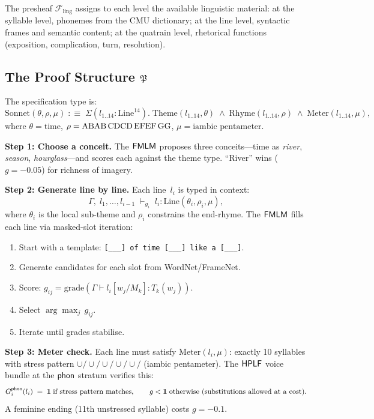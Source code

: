 The presheaf $\mathcal{F}_{\mathrm{ling}}$ assigns to each level
the available linguistic material: at the syllable level, phonemes
from the CMU dictionary; at the line level, syntactic frames and
semantic content; at the quatrain level, rhetorical functions
(exposition, complication, turn, resolution).

\subsection{The Proof Structure $\mathfrak{P}$}

\begin{construction}
\label{con:sonnet-type}
The specification type is:
\[
  \mathrm{Sonnet}(\theta, \rho, \mu)
  \;:\equiv\;
  \Sigma(l_{1..14}:\mathrm{Line}^{14}).\;
  \mathrm{Theme}(l_{1..14},\theta)
  \;\wedge\;
  \mathrm{Rhyme}(l_{1..14},\rho)
  \;\wedge\;
  \mathrm{Meter}(l_{1..14},\mu),
\]
where $\theta=\text{time}$,
$\rho=\text{ABAB\,CDCD\,EFEF\,GG}$,
$\mu=\text{iambic pentameter}$.
\end{construction}

\textbf{Step 1: Choose a conceit.}\quad
The $\mathsf{FMLM}$ proposes three conceits---time as \emph{river},
\emph{season}, \emph{hourglass}---and scores each against the
theme type.  ``River'' wins ($g=-0.05$) for richness of imagery.

\textbf{Step 2: Generate line by line.}\quad
Each line~$l_i$ is typed in context:
\[
  \Gamma,\;l_1,\ldots,l_{i-1}
  \;\vdash_{g_i}\;
  l_i : \mathrm{Line}(\theta_i,\rho_i,\mu),
\]
where $\theta_i$ is the local sub-theme and $\rho_i$ constrains the
end-rhyme.  The $\mathsf{FMLM}$ fills each line via masked-slot iteration:
\begin{enumerate}[nosep]
  \item Start with a template:
    \texttt{[\_\_\_] of time [\_\_\_] like a [\_\_\_]}.
  \item Generate candidates for each slot from WordNet/FrameNet.
  \item Score: $g_{ij}=\mathrm{grade}(\Gamma\vdash l_i[w_j/M_k]:T_k(w_j))$.
  \item Select $\arg\max_j\,g_{ij}$.
  \item Iterate until grades stabilise.
\end{enumerate}

\textbf{Step 3: Meter check.}\quad
Each line must satisfy $\mathrm{Meter}(l_i,\mu)$: exactly 10
syllables with stress pattern $\cup/\cup/\cup/\cup/\cup/$ (iambic
pentameter).  The $\mathsf{HPLF}$ voice bundle at the $\mathsf{phon}$ stratum
verifies this:
\[
  G_i^{\mathsf{phon}}(l_i)
  \;=\;
  \mathbf{1} \;\text{if stress pattern matches},
  \qquad
  g < \mathbf{1}\;\text{otherwise (substitutions allowed at a cost)}.
\]
A feminine ending (11th unstressed syllable) costs $g=-0.1$.


